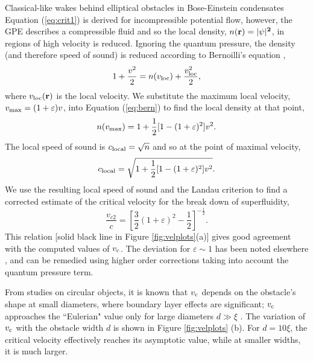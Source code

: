 \begin{chapter}{\label{cha:wake}Classical-like wakes behind elliptical obstacles in Bose-Einstein condensates}
Equation (\ref{eq:crit1}) is derived for incompressible potential flow, however, the GPE describes a compressible fluid and so the local density, $n(\bf r) = |\psi|^2$, in regions of high velocity is reduced. Ignoring the quantum pressure, the density (and therefore speed of sound) is reduced according to Bernoilli's equation \cite{win01},
\begin{equation}
1+\frac{v^2}{2} = n(v_{\rm loc})+\frac{v_{\rm loc}^2}{2},
\label{eq:bern}
\end{equation}
where $v_{\rm loc}(\bf r)$ is the local velocity. We substitute the maximum local velocity, $v_{\rm max}=(1+\varepsilon)v$, into Equation (\ref{eq:bern}) to find the local density at that point,
\begin{equation*}
n(v_{\rm max}) = 1+\frac{1}{2}[1-(1+\varepsilon)^2]v^2.
\end{equation*}
The local speed of sound is $c_{\rm local}=\sqrt{n}$ and so at the point of maximal velocity,
\begin{equation*}
c_{\rm local} = \sqrt{1+\frac{1}{2}[1-(1+\varepsilon)^2]v^2}.
\end{equation*}
We use the resulting local speed of sound and the Landau criterion to find a corrected estimate of the critical velocity for the break down of superfluidity, 
\begin{equation}
\frac{v_{c2}}{c} = \left [\frac{3}{2}(1+\varepsilon)^2 - \frac{1}{2}\right]^{-\frac{1}{2}}.
\label{eq:crit2}
\end{equation}
This relation [solid black line in Figure \ref{fig:velplots}(a)] gives good agreement with the computed values of $v_{\rm c}$.  The deviation for $\varepsilon \sim 1$ has been noted elsewhere \cite{rica2001}, and can be remedied using higher order corrections taking into account the quantum pressure term.

From studies on circular objects, it is known that $v_{\rm c}$ depends on the obstacle's shape at small diameters, where boundary layer effects are significant; $v_{\rm c}$ approaches the ``Eulerian" value only for large diameters $d \gg \xi$ \cite{huepe00,rica2001}.  The variation of $v_{\rm c}$ with the obstacle width $d$ is shown in Figure \ref{fig:velplots} (b).  For $d=10\xi$, the critical velocity effectively reaches its asymptotic value, while at smaller widths, it is much larger.   


\end{chapter}
